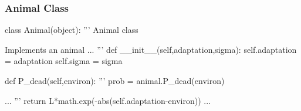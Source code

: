 \begin{frame}[fragile] 
\frametitle{Animal Class}

\begin{python}
class Animal(object):
    '''
    Animal class

    Implements an animal
    ...
    '''
    def __init__(self,adaptation,sigma):
        self.adaptation = adaptation
        self.sigma = sigma
    
    def P_dead(self,environ):
        '''
        prob = animal.P_dead(environ)

        ...
        '''
        return L*math.exp(-abs(self.adaptation-environ))
    ...
\end{python}
\end{frame}


